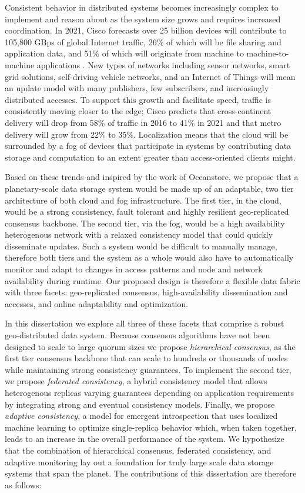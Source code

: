 Consistent behavior in distributed systems becomes increasingly complex to implement and reason about as the system size grows and requires increased coordination.
In 2021, Cisco forecasts over 25 billion devices will contribute to 105,800 GBps of global Internet traffic, 26\% of which will be file sharing and application data, and 51\% of which will originate from machine to machine-to-machine applications \cite{cisco_internet_trends}.
New types of networks including sensor networks, smart grid solutions, self-driving vehicle networks, and an Internet of Things will mean an update model with many publishers, few subscribers, and increasingly distributed accesses.
To support this growth and facilitate speed, traffic is consistently moving closer to the edge; Cisco predicts that cross-continent delivery will drop from 58\% of traffic in 2016 to 41\% in 2021 and that metro delivery will grow from 22\% to 35\%.
Localization means that the cloud will be surrounded by a fog of devices that participate in systems by contributing data storage and computation to an extent greater than access-oriented clients might.

Based on these trends and inspired by the work of Oceanstore, we propose that a planetary-scale data storage system would be made up of an adaptable, two tier architecture of both cloud and fog infrastructure.
The first tier, in the cloud, would be a strong consistency, fault tolerant and highly resilient geo-replicated consensus backbone.
The second tier, via the fog, would be a high availability heterogenous network with a relaxed consistency model that could quickly disseminate updates.
Such a system would be difficult to manually manage, therefore both tiers and the system as a whole would also have to automatically monitor and adapt to changes in access patterns and node and network availability during runtime.
Our proposed design is therefore a flexible data fabric with three facets: geo-replicated consensus, high-availability dissemination and accesses, and online adaptability and optimization.

In this dissertation we explore all three of these facets that comprise a robust geo-distributed data system.
Because consensus algorithms have not been designed to scale to large quorum sizes we propose \emph{hierarchical consensus}, as the first tier consensus backbone that can scale to hundreds or thousands of nodes while maintaining strong consistency guarantees.
To implement the second tier, we propose \emph{federated consistency}, a hybrid consistency model that allows heterogenous replicas varying guarantees depending on application requirements by integrating strong and eventual consistency models.
Finally, we propose \emph{adaptive consistency}, a model for emergent introspection that uses localized machine learning to optimize single-replica behavior which, when taken together, leads to an increase in the overall performance of the system.
We hypothesize that the combination of hierarchical consensus, federated consistency, and adaptive monitoring lay out a foundation for truly large scale data storage systems that span the planet.
The contributions of this dissertation are therefore as follows:

